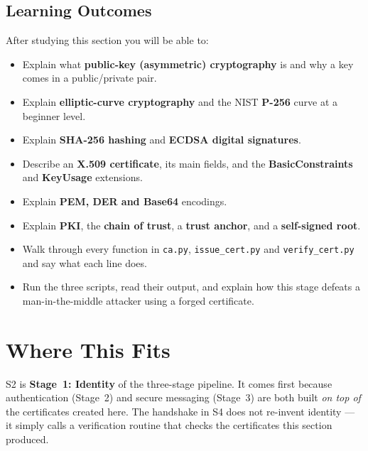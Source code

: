 \documentclass[11pt,a4paper]{article}
\begin{document}
\subsection*{Learning Outcomes}
After studying this section you will be able to:
\begin{itemize}
  \item Explain what \textbf{public-key (asymmetric) cryptography} is and why a
        key comes in a public/private pair.
  \item Explain \textbf{elliptic-curve cryptography} and the NIST \textbf{P-256}
        curve at a beginner level.
  \item Explain \textbf{SHA-256 hashing} and \textbf{ECDSA digital signatures}.
  \item Describe an \textbf{X.509 certificate}, its main fields, and the
        \textbf{BasicConstraints} and \textbf{KeyUsage} extensions.
  \item Explain \textbf{PEM, DER and Base64} encodings.
  \item Explain \textbf{PKI}, the \textbf{chain of trust}, a \textbf{trust
        anchor}, and a \textbf{self-signed root}.
  \item Walk through every function in \texttt{ca.py}, \texttt{issue\_cert.py}
        and \texttt{verify\_cert.py} and say what each line does.
  \item Run the three scripts, read their output, and explain how this stage
        defeats a man-in-the-middle attacker using a forged certificate.
\end{itemize}

\section{Where This Fits}

S2 is \textbf{Stage~1: Identity} of the three-stage pipeline. It comes first
because authentication (Stage~2) and secure messaging (Stage~3) are both built
\emph{on top of} the certificates created here. The handshake in S4 does not
re-invent identity --- it simply calls a verification routine that checks the
certificates this section produced.
\end{document}
